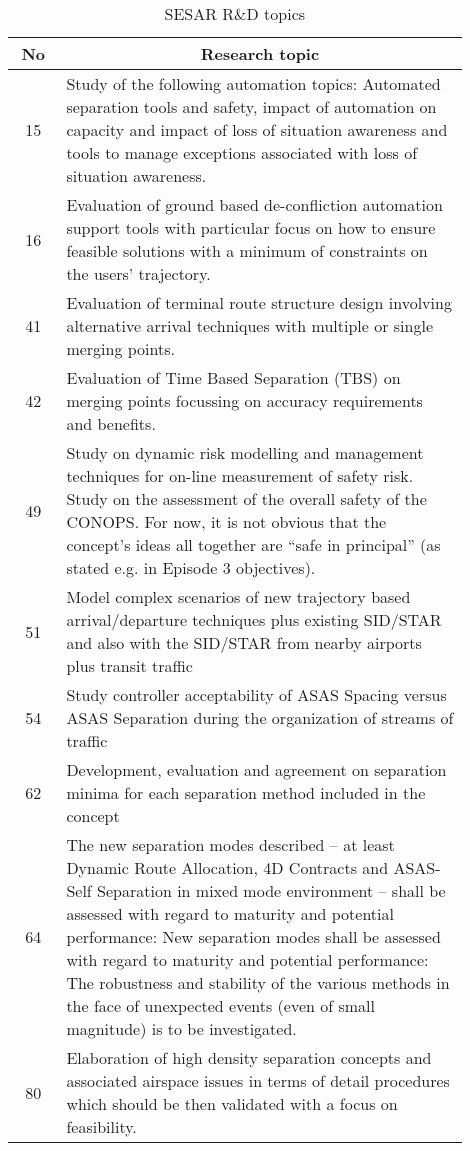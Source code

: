 \documentclass[a4paper, 10pt]{IEEEtran}
\begin{document}
\begin{table}[ht]
\begin{center}
    \begin{tabular}{|p{0.1\linewidth}|p{0.8\linewidth}|}
    \hline
    \multicolumn{1}{|c|}{\textbf{No}} & \multicolumn{1}{|c|}{\textbf{Research topic}}\\
  \hline
\multicolumn{1}{|c|}{15} & Study of the following automation topics:
   Automated separation tools and safety, impact of automation on capacity and impact of loss of situation awareness and tools to manage exceptions associated with loss of situation  awareness.\\
    \hline
\multicolumn{1}{|c|}{16} & Evaluation of ground based de-confliction automation support tools with particular focus on how to ensure
feasible solutions with a minimum of constraints on the users’ trajectory.\\
    \hline
\multicolumn{1}{|c|}{41} &Evaluation of terminal route structure design involving alternative arrival techniques with multiple or single
merging points.\\ 
    \hline
\multicolumn{1}{|c|}{42} &Evaluation of Time Based Separation (TBS) on merging points focussing on accuracy requirements and benefits.\\
    \hline
\multicolumn{1}{|c|}{49} & Study on dynamic risk modelling and management techniques for on-line measurement of safety risk. Study on the assessment of the overall safety of the CONOPS. For now, it is not obvious that the concept’s ideas all together are “safe in principal” (as stated e.g. in Episode 3 objectives).\\
    \hline
\multicolumn{1}{|c|}{51} & Model complex scenarios of new trajectory based arrival/departure techniques plus existing SID/STAR and
also with the SID/STAR from nearby airports plus transit traffic\\
    \hline
\multicolumn{1}{|c|}{54} & Study controller acceptability of ASAS Spacing versus ASAS Separation during the organization of streams of traffic\\
    \hline
\multicolumn{1}{|c|}{62} & Development, evaluation and agreement on separation minima for each separation method included in the concept\\
\hline
    \multicolumn{1}{|c|}{64} & The new separation modes described – at least Dynamic Route Allocation, 4D Contracts and ASAS-Self Separation in mixed mode environment – shall be assessed with regard to maturity and potential performance: New separation modes shall be assessed with regard to maturity and potential performance: The robustness and stability of the various methods in the face of unexpected events (even of small magnitude) is to be investigated. \\
    \hline
       \multicolumn{1}{|c|}{80} & Elaboration of high density separation concepts and associated airspace issues in terms of detail procedures which should be then validated with a focus on feasibility.\\
    \hline
 \end{tabular}\caption{{SESAR} R\&D topics \cite{SESARconceptOfOperation}}\label{tab:SESARResearch}
\end{center}
\end{table}
\end{document}
